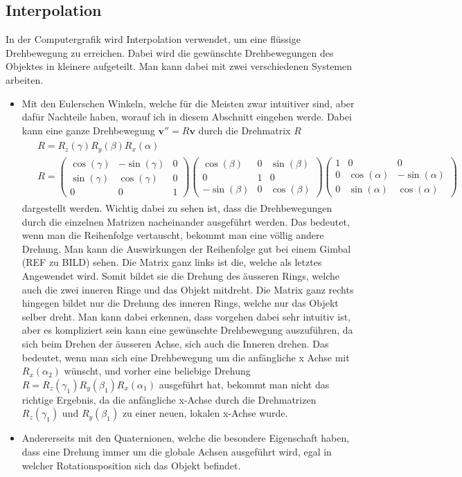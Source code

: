 \subsection{Interpolation}
In der Computergrafik wird Interpolation verwendet, um eine flüssige Drehbewegung zu erreichen. Dabei wird die gewünschte Drehbewegungen des Objektes in kleinere aufgeteilt. Man kann dabei mit zwei verschiedenen Systemen arbeiten. 
\begin{itemize}
	\item Mit den Eulerschen Winkeln, welche für die Meisten zwar intuitiver sind, aber dafür Nachteile haben, worauf ich in diesem Abschnitt eingehen werde. Dabei kann eine ganze Drehbewegung $\mathbf{v}'' = R\mathbf{v}$ durch die Drehmatrix $R$
	\begin{align}
		\begin{split}
			&R = R_z(\gamma) R_y(\beta) R_x(\alpha)\\
			&R = 
			\begin{pmatrix} 
				\cos(\gamma) & -\sin(\gamma) & 0\\ \sin(\gamma) & \cos(\gamma) & 0 \\ 0 & 0 & 1 
			\end{pmatrix}
			\begin{pmatrix}
				\cos(\beta) &  0 & \sin(\beta)\\ 0 & 1 & 0 \\ -\sin(\beta) & 0 & \cos(\beta)
			\end{pmatrix}
			\begin{pmatrix} 
				1 & 0 & 0 \\ 0 & \cos(\alpha) & -\sin(\alpha)\\ 0 & \sin(\alpha) & \cos(\alpha)
			\end{pmatrix}
		\end{split}
	\end{align}
	dargestellt werden. Wichtig dabei zu sehen ist, dass die Drehbewegungen durch die einzelnen Matrizen nacheinander ausgeführt werden. Das bedeutet, wenn man die Reihenfolge vertauscht, bekommt man eine völlig andere Drehung. Man kann die Auswirkungen der Reihenfolge gut bei einem Gimbal (REF zu BILD) sehen. Die Matrix ganz links ist die, welche als letztes Angewendet wird. Somit bildet sie die Drehung des äusseren Rings, welche auch die zwei inneren Ringe und das Objekt mitdreht. Die Matrix ganz rechts hingegen bildet nur die Drehung des inneren Rings, welche nur das Objekt selber dreht. Man kann dabei erkennen, dass vorgehen dabei sehr intuitiv ist, aber es kompliziert sein kann eine gewünschte Drehbewegung auszuführen, da sich beim Drehen der äusseren Achse, sich auch die Inneren drehen. Das bedeutet, wenn man sich eine Drehbewegung um die anfängliche x Achse mit $R_x(\alpha_2)$ wünscht, und vorher eine beliebige Drehung $R = R_z(\gamma_1) R_y(\beta_1) R_x(\alpha_1)$ ausgeführt hat, bekommt man nicht das richtige Ergebnis, da die anfängliche x-Achse durch die Drehmatrizen $R_z(\gamma_1)$ und $R_y(\beta_1)$ zu einer neuen, lokalen x-Achse wurde. 
	\item Andererseits mit den Quaternionen, welche die besondere Eigenschaft haben, dass eine Drehung immer um die globale Achsen ausgeführt wird, egal in welcher Rotationsposition sich das Objekt befindet.
\end{itemize}
